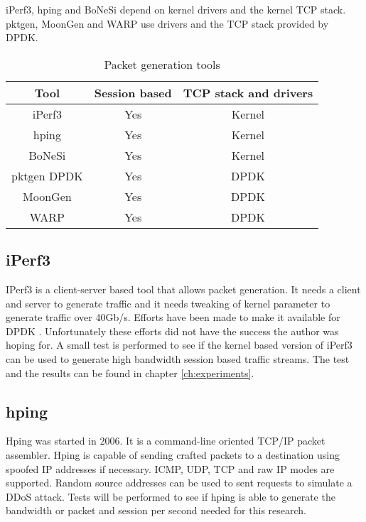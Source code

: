 iPerf3, hping and BoNeSi depend on kernel drivers and the kernel TCP stack. pktgen, MoonGen and WARP use drivers and the TCP stack provided by DPDK.

\begin{table*}[ht]
\centering
\begin{tabular}{|c|c|c|} \hline
\textbf{Tool} & \textbf{Session based} & \textbf{TCP stack and drivers} \\ \hline
iPerf3\cite{iperf} & Yes & Kernel  \\ \hline
hping\cite{hping}  & Yes & Kernel \\ \hline
BoNeSi\cite{bonesi} & Yes & Kernel \\ \hline
pktgen DPDK\cite{pktgen-dpdk} & Yes & DPDK \\ \hline
MoonGen\cite{moongen} & Yes & DPDK \\ \hline
WARP\cite{warp} & Yes & DPDK \\ \hline
\end{tabular}
\caption{Packet generation tools}
\label{table:tools}
\end{table*} 

\subsection{iPerf3}\label{sub:iperf3}
IPerf3 is a client-server based tool that allows packet generation.
It needs a client and server to generate traffic and it needs tweaking of kernel parameter to generate traffic over 40Gb/s. Efforts have been made to make it available for DPDK \cite{jelte}. Unfortunately these efforts did not have the success the author was hoping for. 
A small test is performed to see if the kernel based version of iPerf3 can be used to generate high bandwidth session based traffic streams. The test and the results can be found in chapter \ref{ch:experiments}.

\subsection{hping}\label{sub:hping}
Hping was started in 2006. It is a command-line oriented TCP/IP packet assembler. 
Hping is capable of sending crafted packets to a destination using spoofed IP addresses if necessary. 
ICMP, UDP, TCP and raw IP modes are supported. Random source addresses can be used to sent requests to simulate a DDoS attack. 
Tests will be performed to see if hping is able to generate the bandwidth or packet and session per second needed for this research. 


